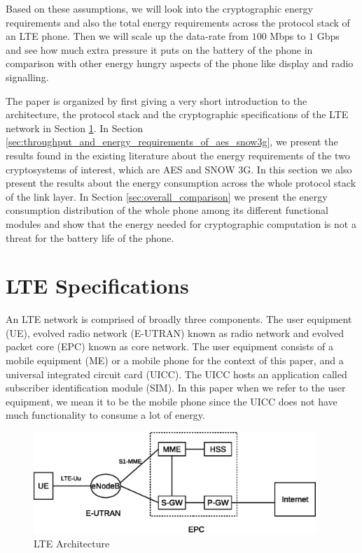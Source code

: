 \documentclass[lnicst,sechang,a4paper]{svmultln}
\begin{document}
Based on these assumptions, we will look into the cryptographic energy requirements and also the total energy requirements across the protocol stack of an LTE phone. Then we will scale up the data-rate from $100$ Mbps to $1$ Gbps and see how much extra pressure it puts on the battery of the phone in comparison with other energy hungry aspects of the phone like display and radio signalling.

The paper is organized by first giving a very short introduction to the architecture, the protocol stack and the cryptographic specifications of the LTE network in Section \ref{sec:lte_specifications}. In Section \ref{sec:throughput_and_energy_requirements_of_aes_snow3g}, we present the results found in the existing literature about the energy requirements of the two cryptosystems of interest, which are AES and SNOW 3G. In this section we also present the results about the energy consumption across the whole protocol stack of the link layer. In Section \ref{sec:overall_comparison} we present the energy consumption distribution of the whole phone among its different functional modules and show that the energy needed for cryptographic computation is not a threat for the battery life of the phone. 

\section{LTE Specifications}
\label{sec:lte_specifications}
An LTE network is comprised of broadly three components. The user equipment (UE), evolved radio network (E-UTRAN) known as radio network and evolved packet core (EPC) known as core network. The user equipment consists of a mobile equipment (ME) or a mobile phone for the context of this paper, and a universal integrated circuit card (UICC). The UICC hosts an application called subscriber identification module (SIM). In this paper when we refer to the user equipment, we mean it to be the mobile phone since the UICC does not have much functionality to consume a lot of energy.

\begin{figure}
\begin{center}
  \includegraphics[width=0.95\textwidth]{lte_architecture.eps}
\caption{LTE Architecture}
\label{fig:protocl_stack}       %
\end{center}
\end{figure}
\end{document}
